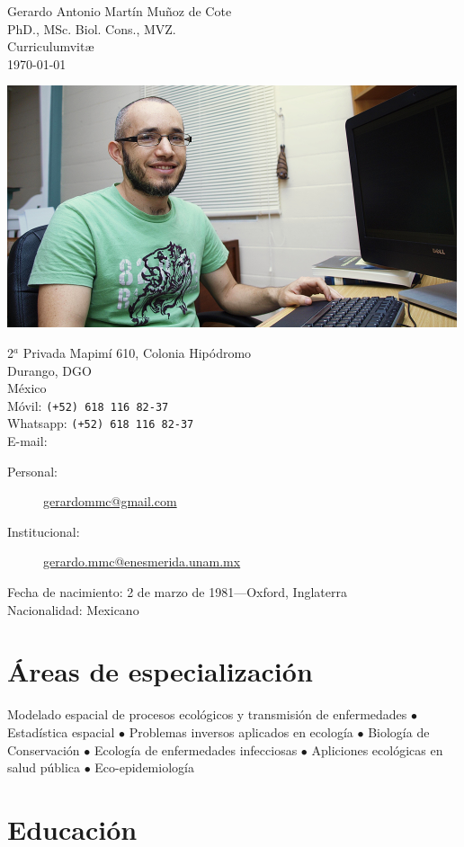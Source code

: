 \documentclass[11pt, letter]{article}
\begin{document}
{\LARGE Gerardo Antonio Mart\'in Mu\~noz de Cote}\\ [0.5cm]
{\small PhD., MSc. Biol. Cons., MVZ.}\\[0.5cm]
{\large Curriculumvit\ae}\\
{\small \today}\\[0.5cm]

\begin{center}
	\includegraphics[width=.4\linewidth]{Gerardo-OHRG-1-pequena}
\end{center}
\vspace{1.5cm}

2$^a$ Privada Mapim\'i 610, Colonia Hip\'odromo\\
Durango, DGO\\
M\'exico\\[.2cm]
M\'ovil: \texttt{(+52) 618 116 82-37}\\
Whatsapp: \texttt{(+52) 618 116 82-37}\\
E-mail:
\begin{description}
	\item[Personal:] \href{mailto:gerardommc@gmail.com}{gerardommc@gmail.com}
	\item[Institucional:] \href{mailto:gerardo.mmc@enesmerida.unam.mx}{gerardo.mmc@enesmerida.unam.mx}
\end{description}
Fecha de nacimiento:  2 de marzo de 1981---Oxford, Inglaterra\\
Nacionalidad:  Mexicano

\section*{\'Areas de especializaci\'on}
Modelado espacial de procesos ecol\'ogicos y transmisi\'on de enfermedades $ \bullet $ Estad\'istica espacial $ \bullet $ Problemas inversos aplicados en ecolog\'ia $ \bullet $ Biolog\'ia de Conservaci\'on $ \bullet $ Ecolog\'ia de enfermedades infecciosas $ \bullet $ Apliciones ecol\'ogicas en salud p\'ublica $ \bullet $ Eco-epidemiolog\'ia

\section*{Educaci\'on}
\end{document}
